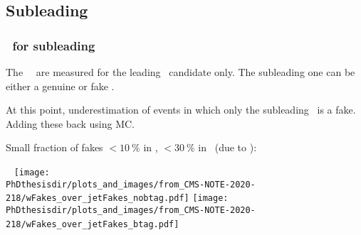 \begin{frame}
\begin{minipage}[c]{.45\textwidth}
\begin{center}
\end{center}
\end{minipage}

\end{frame}

\subsection*{Subleading \ftauh}
\begin{frame}
\frametitle{\Fakefactors\ for subleading \tauh}

\manip The \tauh\tauh\ \fakefactors\ are measured for the leading \tauh\ candidate only.
\submanip The subleading one can be either a genuine or fake \tauh.

\manip At this point, underestimation of events in which only the subleading \tauh\ is a fake.
\submanip Adding these back using MC.

\manip Small fraction of fakes $<\SI{10}{\%}$ in \CATnobtag, $<\SI{30}{\%}$ in \CATbtag\ (due to \ttbar):

~\hfill
\texttt{[image: \\PhDthesisdir/plots\_and\_images/from\_CMS-NOTE-2020-218/wFakes\_over\_jetFakes\_nobtag.pdf]}
\hfill
\texttt{[image: \\PhDthesisdir/plots\_and\_images/from\_CMS-NOTE-2020-218/wFakes\_over\_jetFakes\_btag.pdf]}
\hfill~

\vspace{-5pt}


\end{frame}

